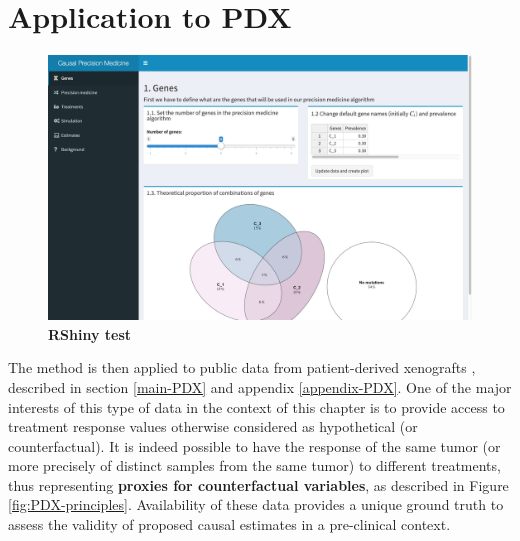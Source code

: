 \documentclass[a4paper,12pt,twoside,onecolumn,openright,final,oldfontcommands]{memoir}
\begin{document}
\section{Application to PDX}\label{application-to-pdx}

\begin{figure}

{\centering \includegraphics[width=0.9\linewidth]{fig/screenshot-shiny} 

}

\caption[RShiny interactive application to investigate various simulation scenarios of precision medicine evaluation]{\textbf{RShiny test}}\label{fig:Shiny2}
\end{figure}



The method is then applied to public data from patient-derived
xenografts \citep{gao2015high}, described in section \ref{main-PDX} and
appendix \ref{appendix-PDX}. One of the major interests of this type of
data in the context of this chapter is to provide access to treatment
response values otherwise considered as hypothetical (or
counterfactual). It is indeed possible to have the response of the same
tumor (or more precisely of distinct samples from the same tumor) to
different treatments, thus representing \textbf{proxies for
counterfactual variables}, as described in Figure
\ref{fig:PDX-principles}. Availability of these data provides a unique
ground truth to assess the validity of proposed causal estimates in a
pre-clinical context.
\end{document}
